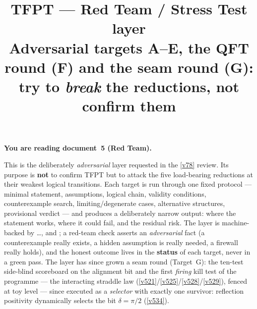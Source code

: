 \documentclass[11pt,a4paper]{article}
\title{\vspace{-1.2cm}\textbf{TFPT --- Red Team / Stress Test layer}\\[2mm]
\large Adversarial targets A--E, the QFT round (F) and the seam round (G): try to \emph{break} the reductions, not confirm them}
\author{\TFPTauthors}\date{\TFPTdatestamp}
\begin{document}
\maketitle


\noindent\textbf{You are reading \textbf{document~5} (Red Team).}


\TFPTbadges
\TFPTclaimstack[none]

\vspace{-0.6cm}

\begin{keybox}
This is the deliberately \emph{adversarial} layer requested in the \vref{v78} review. Its purpose is
\textbf{not} to confirm TFPT but to attack the five load-bearing reductions at their weakest
logical transitions. Each target is run through one fixed protocol --- minimal statement,
assumptions, logical chain, validity conditions, counterexample search, limiting/degenerate
cases, alternative structures, provisional verdict --- and produces a deliberately narrow output:
where the statement works, where it could fail, and the residual risk. The layer is machine-backed
by  \dots {},  and
; a red-team check asserts an \emph{adversarial} fact (a counterexample
really exists, a hidden assumption is really needed, a firewall really holds), and the honest
outcome lives in the \textbf{status} of each target, never in a green pass. The layer has since
grown a seam round (Target~G): the ten-test side-blind scoreboard on the alignment bit and the
first \emph{firing} kill test of the programme --- the interacting straddle law
(\vref{v521}/\vref{v525}/\vref{v528}/\vref{v529}), fenced at toy level --- since executed as a
\emph{selector} with exactly one survivor: reflection positivity dynamically selects the bit
$\delta=\pi/2$ (\vref{v534}).
\end{keybox}
\end{document}
